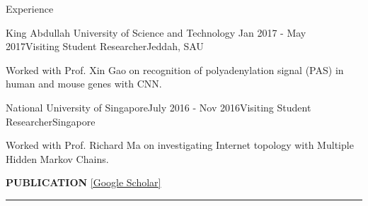 \documentclass{resume} %
\begin{document}
\begin{rSection}{Experience}

\begin{rSubsection}{King Abdullah University of Science and Technology }{Jan 2017 - May 2017}{Visiting Student Researcher}{Jeddah, SAU}
\item Worked with Prof. Xin Gao on recognition of polyadenylation signal (PAS) in human and mouse genes with CNN.
\end{rSubsection}


\begin{rSubsection}{National University of Singapore}{July 2016 - Nov 2016}{Visiting Student Researcher}{Singapore}
\item Worked with Prof. Richard Ma on investigating Internet topology with Multiple Hidden Markov Chains.
\end{rSubsection}



\end{rSection}

\clearpage

\sectionskip
\MakeUppercase{\bf Publication} \href{https://scholar.google.com/citations?hl=en&user=Rc4ZMCEAAAAJ}{[Google Scholar]}
\sectionlineskip
\hrule %
\end{document}
